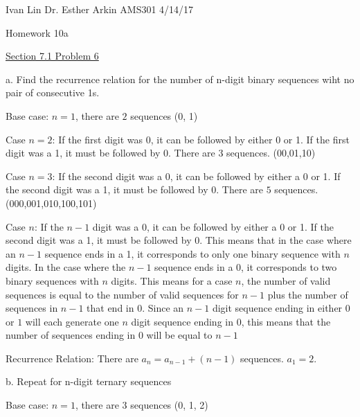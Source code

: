 \documentclass{article}
\begin{document}
Ivan Lin\newline{}
Dr. Esther Arkin\newline{}
AMS301\newline{}
4/14/17

\begin{center}
  Homework 10a
\end{center}

\underline{Section 7.1 Problem 6}\newline{}

a. Find the recurrence relation for the number of n-digit binary sequences wiht no pair of consecutive 1s. \newline{}

Base case: $n=1$, there are $2$ sequences (0, 1)\newline{}

Case $n=2$: If the first digit was 0, it can be followed by either 0 or 1. If the first digit was a 1, it must be followed by 0. There are $3$ sequences. (00,01,10)\newline{}

Case $n=3$: If the second digit was a 0, it can be followed by either a 0 or 1. If the second digit was a 1, it must be followed by 0. There are $5$ sequences. (000,001,010,100,101)\newline{}

Case $n$: If the $n-1$ digit was a 0, it can be followed by either a 0 or 1. If the second digit was a 1, it must be followed by 0.\newline{}
This means that in the case where an $n-1$ sequence ends in a 1, it corresponds to only one binary sequence with $n$ digits. In the case where the $n-1$ sequence ends in a 0, it corresponds to two binary sequences with $n$ digits. This means for a case $n$, the number of valid sequences is equal to the number of valid sequences for $n-1$ plus the number of sequences in $n-1$ that end in 0. Since an $n-1$ digit sequence ending in either $0$ or $1$ will each generate one $n$ digit sequence ending in $0$, this means that the number of sequences ending in $0$ will be equal to $n-1$ \newline{}

Recurrence Relation: There are $a_n=a_{n-1}+(n-1)$ sequences. $a_1=2$.\newline{}

b. Repeat for n-digit ternary sequences \newline{}

Base case: $n=1$, there are $3$ sequences (0, 1, 2)\newline{}
\end{document}
